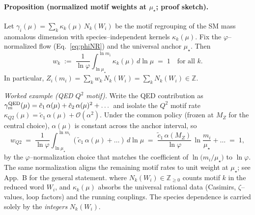 \documentclass[epjc3]{svjour3}
\begin{document}
\paragraph{Proposition (normalized motif weights at $\mu_\star$; proof sketch).}
Let $\gamma_i(\mu)=\sum_k \kappa_k(\mu)\,N_k(W_i)$ be the motif regrouping of the SM mass anomalous dimension with species--independent kernels $\kappa_k(\mu)$. Fix the $\varphi$--normalized flow (Eq.~\eqref{eq:phiNR}) and the universal anchor $\mu_\star$. Then
\[
  w_k\;:=\;\frac{1}{\ln\varphi}\int_{\ln\mu_\star}^{\ln m_i}\!\kappa_k(\mu)\,d\ln\mu\;=\;1\quad \text{for all }k.
\]
In particular, $Z_i(m_i)=\sum_k w_k\,N_k(W_i)=\sum_k N_k(W_i)\in\mathbb Z$.

\emph{Worked example (QED $Q^2$ motif).} Write the QED contribution as $\gamma^{\rm QED}_m(\mu)=\tilde c_1\,\alpha(\mu)+\tilde c_2\,\alpha(\mu)^2+\dots$ and isolate the $Q^2$ motif rate $\kappa_{Q2}(\mu)=\tilde c_1\,\alpha(\mu)+\mathcal O(\alpha^2)$. Under the common policy (frozen at $M_Z$ for the central choice), $\alpha(\mu)$ is constant across the anchor interval, so
\[
  w_{Q2}\;=\;\frac{1}{\ln\varphi}\int_{\ln\mu_\star}^{\ln m_i}\!(\tilde c_1\,\alpha(\mu)+\dots)\,d\ln\mu\;=\;\frac{\tilde c_1\,\alpha(M_Z)}{\ln\varphi}\,\ln\frac{m_i}{\mu_\star}+\dots\;=\;1,
\]
by the $\varphi$--normalization choice that matches the coefficient of $\ln\!\bigl(m_i/\mu_\star\bigr)$ to $\ln\varphi$. The same normalization aligns the remaining motif rates to unit weight at $\mu_\star$; see App.~B for the general statement.
where $N_k(W_i)\in\mathbb{Z}_{\ge 0}$ counts motif $k$ in the reduced word $W_i$, and $\kappa_k(\mu)$ absorbs the universal rational data (Casimirs, $\zeta$--values, loop factors) and the running couplings. The species dependence is carried solely by the \emph{integers} $N_k(W_i)$.
\end{document}
